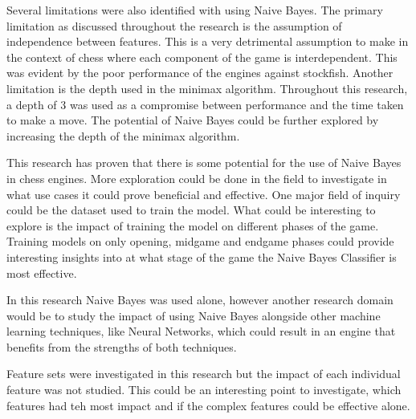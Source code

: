 Several limitations were also identified with using Naive Bayes. The primary limitation as discussed throughout the research is the assumption of independence between features. This is a very detrimental assumption to make in the context of chess where each component of the game is interdependent. This was evident by the poor performance of the engines against stockfish. Another limitation is the depth used in the minimax algorithm. Throughout this research, a depth of 3 was used as a compromise between performance and the time taken to make a move. The potential of Naive Bayes could be further explored by increasing the depth of the minimax algorithm.

This research has proven that there is some potential for the use of Naive Bayes in chess engines. More exploration could be done in the field to investigate in what use cases it could prove beneficial and effective. One major field of inquiry could be the dataset used to train the model. What could be interesting to explore is the impact of training the model on different phases of the game. Training models on only opening, midgame and endgame phases could provide interesting insights into at what stage of the game the Naive Bayes Classifier is most effective. 

In this research Naive Bayes was used alone, however another research domain would be to study the impact of using Naive Bayes alongside other machine learning techniques, like Neural Networks, which could result in an engine that benefits from the strengths of both techniques.

Feature sets were investigated in this research but the impact of each individual feature was not studied. This could be an interesting point to investigate, which features had teh most impact and if the complex features could be effective alone.







